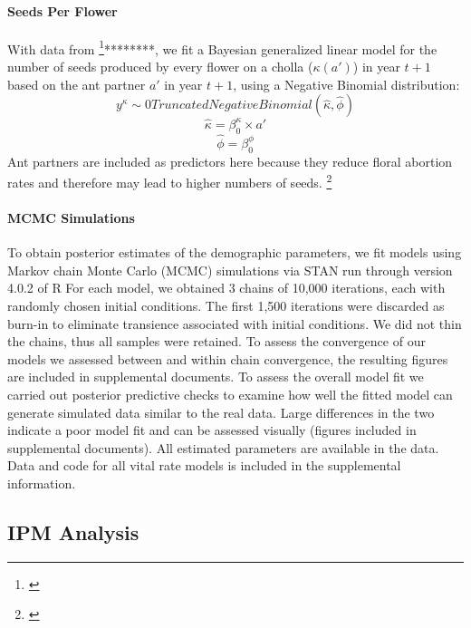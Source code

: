 \documentclass[11pt]{article}
\newcommand{\tom}[2]{{\color{red}{#1}}\footnote{\textit{\color{red}{#2}}}}
\begin{document}
\paragraph{Seeds Per Flower}
With data from \tom{Miller 2007}{CITE}********, we fit a Bayesian generalized linear model for the number of seeds produced by every flower on a cholla ($\kappa(a')$) in year $t+1$ based on the ant partner $a'$ in year $t+1$, using a Negative Binomial distribution:
$$y^{\kappa} \sim 0 Truncated Negative Binomial(\hat{\kappa},\hat{\phi})$$
$$ \hat{\kappa } = \beta_{0}^{\kappa} \times a'$$
$$\hat{\phi} = \beta_{0}^{\phi}$$
Ant partners are included as predictors here because they reduce floral abortion rates and therefore may lead to higher numbers of seeds. 
\tom{}{This paragraph needs to address how we assigned seed number to the ``other'' category.}

\paragraph{MCMC Simulations}
To obtain posterior estimates of the demographic parameters, we fit models using Markov chain Monte Carlo (MCMC) simulations via STAN run through version 4.0.2 of R \cite{Rcite,Rstancite} 
For each model, we obtained 3 chains of 10,000 iterations, each with randomly chosen initial conditions. 
The first 1,500 iterations were discarded as burn-in to eliminate transience associated with initial conditions. 
We did not thin the chains, thus all samples were retained. 
To assess the convergence of our models we assessed between and within chain convergence, the resulting figures are included in supplemental documents. 
To assess the overall model fit we carried out posterior predictive checks to examine how well the fitted model can generate simulated data similar to the real data.
Large differences in the two indicate a poor model fit and can be assessed visually (figures included in supplemental documents). 
All estimated parameters are available in the data. 
Data and code for all vital rate models is included in the supplemental information.

\subsection*{IPM Analysis}
\end{document}
